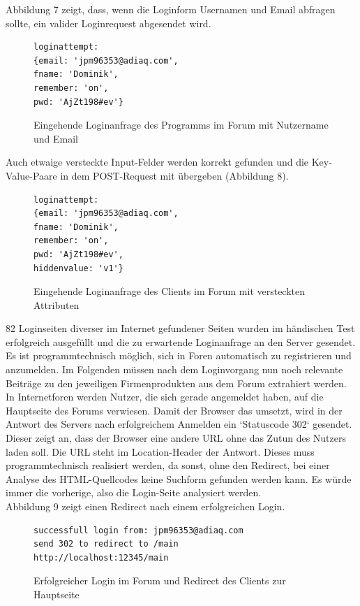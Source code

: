 Abbildung 7 zeigt, dass, wenn die Loginform Usernamen und Email abfragen sollte, ein valider Loginrequest abgesendet wird.

\begin{figure}[h!]
\begin{lstlisting}[language=HTML5]
loginattempt:
{email: 'jpm96353@adiaq.com',
fname: 'Dominik',
remember: 'on',
pwd: 'AjZt198#ev'}
\end{lstlisting}
\caption{Eingehende Loginanfrage des Programms im Forum mit Nutzername und Email}
\end{figure}

Auch etwaige versteckte Input-Felder werden korrekt gefunden und die Key-Value-Paare in dem POST-Request mit übergeben (Abbildung 8).

\begin{figure}[h!]
\begin{lstlisting}[language=HTML5]
loginattempt:
{email: 'jpm96353@adiaq.com',
fname: 'Dominik',
remember: 'on',
pwd: 'AjZt198#ev',
hiddenvalue: 'v1'}
\end{lstlisting}
\caption{Eingehende Loginanfrage des Clients im Forum mit versteckten Attributen}
\end{figure}


82 Loginseiten diverser im Internet gefundener Seiten wurden im händischen Test erfolgreich ausgefüllt und die zu erwartende Loginanfrage an den Server gesendet.\\
Es ist programmtechnisch möglich, sich in Foren automatisch zu registrieren und anzumelden. Im Folgenden müssen nach dem Loginvorgang nun noch relevante Beiträge zu den jeweiligen Firmenprodukten aus dem Forum extrahiert werden.\newline
In Internetforen werden Nutzer, die sich gerade angemeldet haben, auf die Hauptseite des Forums verwiesen. Damit der Browser das umsetzt, wird in der Antwort des Servers nach erfolgreichem Anmelden ein `Statuscode 302` gesendet. Dieser zeigt an, dass der Browser eine andere URL ohne das Zutun des Nutzers laden soll. Die URL steht im Location-Header der Antwort. Dieses muss programmtechnisch realisiert werden, da sonst, ohne den Redirect, bei einer Analyse des HTML-Quellcodes keine Suchform gefunden werden kann. Es würde immer die vorherige, also die Login-Seite analysiert werden.\\
Abbildung 9 zeigt einen Redirect nach einem erfolgreichen Login.

\begin{figure}[ht]
\begin{lstlisting}[language=HTML5]
successfull login from: jpm96353@adiaq.com
send 302 to redirect to /main
http://localhost:12345/main
\end{lstlisting}
\caption{Erfolgreicher Login im Forum und Redirect des Clients zur Hauptseite}
\end{figure}

